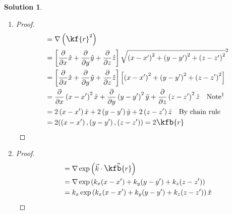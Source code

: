 \documentclass[10pt]{article}
\theoremstyle{definition}
\newtheorem{soln}{Solution}
\newcommand{\ux}{\hat{x}}
\newcommand{\uy}{\hat{y}}
\newcommand{\uz}{\hat{z}}
\newcommand{\primed}[1]{#1^\prime}
\newcommand{\scriptr}{\fontsize{12pt}{12pt}\kf{r}}
\newcommand{\bscriptr}{\fontsize{12pt}{12pt}\kfb{r}}
\begin{document}
\begin{soln} ~
  \begin{enumerate}[label=(\alph*)]
    \item \begin{proof}
            \begin{align*}
               & =\nabla\left(\scriptr^2\right)                                                                                                                                                                                     \\
               & =\left[\frac{\partial}{\partial x}\ux + \frac{\partial}{\partial y}\uy + \frac{\partial}{\partial z}\uz \right]\sqrt{\left(x-\primed{x}\right)^2 + \left(y-\primed{y}\right)^2+ \left(z-\primed{z}\right)^2}^2     \\
               & =\left[\frac{\partial}{\partial x}\ux + \frac{\partial}{\partial y}\uy + \frac{\partial}{\partial z}\uz \right]\left[\left(x-\primed{x}\right)^2 + \left(y-\primed{y}\right)^2+ \left(z-\primed{z}\right)^2\right] \\
               & =\frac{\partial}{\partial x}\left(x-\primed{x}\right)^2\ux + \frac{\partial}{\partial y} \left(y-\primed{y}\right)^2\uy + \frac{\partial}{\partial z}\left(z-\primed{z}\right)^2\uz \quad \text{Note\footnotemark} \\
               & =2\left(x-\primed{x}\right)\ux + 2\left(y-\primed{y}\right)\uy+2\left(z-\primed{z}\right)\uz \quad \text{By chain rule}                                                                                            \\
               & =2(\left(x-\primed{x}\right),\left(y-\primed{y}\right),\left(z-\primed{z}\right)) = 2\bscriptr\qedhere
            \end{align*}
          \end{proof}
    \item \begin{proof}
            \begin{align*}
               & =  \nabla\exp\left(\vec{k}\cdot\vec{\bscriptr}\right)                                   \\
               & =  \nabla\exp\left(k_x(x-\primed{x})+k_y(y-\primed{y})+k_z(z-\primed{z})\right)         \\
               & = k_x\exp\left(k_x(x-\primed{x})+k_y(y-\primed{y})+k_z(z-\primed{z})\right)\ux      \\

\end{align*}
\end{proof}
\end{enumerate}
\end{soln}
\end{document}

